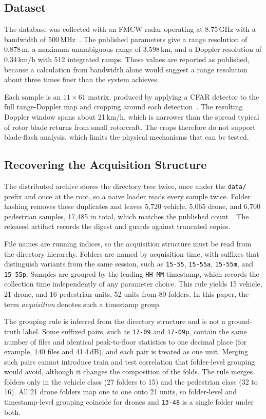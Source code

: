 \documentclass{ICIC2026}
\begin{document}
\subsection{Dataset}

The database was collected with an FMCW radar operating at 8.75\,GHz with a bandwidth of 500\,MHz~\cite{quevedo2019}. The published parameters give a range resolution of 0.878\,m, a maximum unambiguous range of 3.598\,km, and a Doppler resolution of 0.34\,km/h with 512 integrated ramps. These values are reported as published, because a calculation from bandwidth alone would suggest a range resolution about three times finer than the system achieves.

Each sample is an $11 \times 61$ matrix, produced by applying a CFAR detector to the full range-Doppler map and cropping around each detection~\cite{roldan2020,liaquat2024tut}. The resulting Doppler window spans about 21\,km/h, which is narrower than the spread typical of rotor blade returns from small rotorcraft. The crops therefore do not support blade-flash analysis, which limits the physical mechanisms that can be tested.

\subsection{Recovering the Acquisition Structure}

The distributed archive stores the directory tree twice, once under the \texttt{data/} prefix and once at the root, so a naive loader reads every sample twice. Folder hashing removes these duplicates and leaves 5,720 vehicle, 5,065 drone, and 6,700 pedestrian samples, 17,485 in total, which matches the published count~\cite{zhang2025}. The released artifact records the digest and guards against truncated copies.

File names are running indices, so the acquisition structure must be read from the directory hierarchy. Folders are named by acquisition time, with suffixes that distinguish variants from the same session, such as \texttt{15-55}, \texttt{15-55a}, \texttt{15-55m}, and \texttt{15-55p}. Samples are grouped by the leading \texttt{HH-MM} timestamp, which records the collection time independently of any parameter choice. This rule yields 15 vehicle, 21 drone, and 16 pedestrian units, 52 units from 80 folders. In this paper, the term \emph{acquisition} denotes such a timestamp group.

The grouping rule is inferred from the directory structure and is not a ground-truth label. Some suffixed pairs, such as \texttt{17-09} and \texttt{17-09p}, contain the same number of files and identical peak-to-floor statistics to one decimal place (for example, 140 files and 41.4\,dB), and each pair is treated as one unit. Merging such pairs cannot introduce train and test correlation that folder-level grouping would avoid, although it changes the composition of the folds. The rule merges folders only in the vehicle class (27 folders to 15) and the pedestrian class (32 to 16). All 21 drone folders map one to one onto 21 units, so folder-level and timestamp-level grouping coincide for drones and \texttt{13-48} is a single folder under both.
\end{document}
